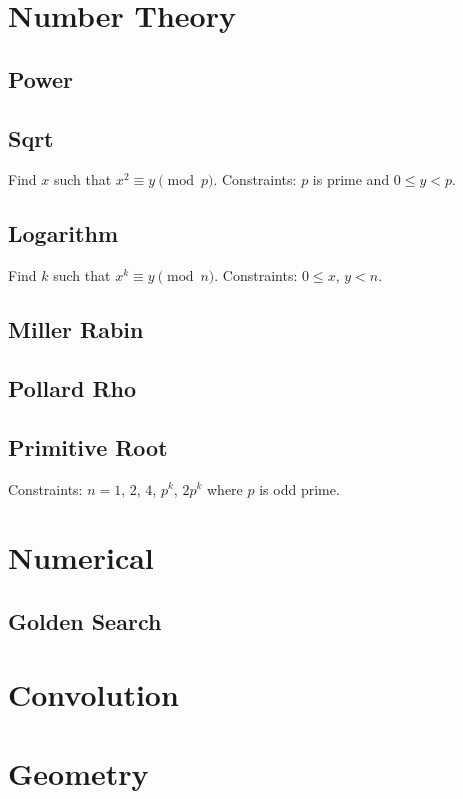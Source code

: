 \documentclass{article}
\begin{document}
\begin{multicols}{2}
    \section{Number Theory}
    \subsection{Power}
    
    \subsection{Sqrt}
    Find $x$ such that $x^2\equiv y\pmod p$.
    \newline Constraints: $p$ is prime and $0\le y<p$.
    
    \subsection{Logarithm}
    Find $k$ such that $x^k\equiv y\pmod n$.
    \newline Constraints: $0\le x$, $y<n$.
    
    \subsection{Miller Rabin}
    
    \subsection{Pollard Rho}
    
    \subsection{Primitive Root}
    Constraints: $n=1$, $2$, $4$, $p^k$, $2p^{k}$ where $p$ is odd prime.
    
    
    \section{Numerical}
    \subsection{Golden Search}
    

    \section{Convolution}

    \section{Geometry}
\end{multicols}
\end{document}
